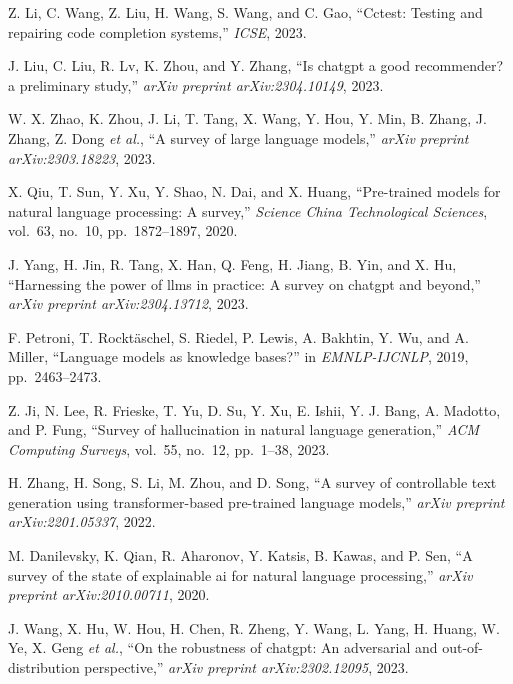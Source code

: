 \begin{enumerate}[leftmargin=2em,label={[\arabic*]}]
\item Z. Li, C. Wang, Z. Liu, H. Wang, S. Wang, and C. Gao, ``Cctest: Testing and repairing code completion systems,'' \textit{ICSE}, 2023.

\item J. Liu, C. Liu, R. Lv, K. Zhou, and Y. Zhang, ``Is chatgpt a good recommender? a preliminary study,'' \textit{arXiv preprint arXiv:2304.10149}, 2023.

\item W. X. Zhao, K. Zhou, J. Li, T. Tang, X. Wang, Y. Hou, Y. Min, B. Zhang, J. Zhang, Z. Dong \textit{et al.}, ``A survey of large language models,'' \textit{arXiv preprint arXiv:2303.18223}, 2023.

\item X. Qiu, T. Sun, Y. Xu, Y. Shao, N. Dai, and X. Huang, ``Pre-trained models for natural language processing: A survey,'' \textit{Science China Technological Sciences}, vol.~63, no.~10, pp.~1872--1897, 2020.

\item J. Yang, H. Jin, R. Tang, X. Han, Q. Feng, H. Jiang, B. Yin, and X. Hu, ``Harnessing the power of llms in practice: A survey on chatgpt and beyond,'' \textit{arXiv preprint arXiv:2304.13712}, 2023.

\item F. Petroni, T. Rockt\"{a}schel, S. Riedel, P. Lewis, A. Bakhtin, Y. Wu, and A. Miller, ``Language models as knowledge bases?'' in \textit{EMNLP-IJCNLP}, 2019, pp.~2463--2473.

\item Z. Ji, N. Lee, R. Frieske, T. Yu, D. Su, Y. Xu, E. Ishii, Y. J. Bang, A. Madotto, and P. Fung, ``Survey of hallucination in natural language generation,'' \textit{ACM Computing Surveys}, vol.~55, no.~12, pp.~1--38, 2023.

\item H. Zhang, H. Song, S. Li, M. Zhou, and D. Song, ``A survey of controllable text generation using transformer-based pre-trained language models,'' \textit{arXiv preprint arXiv:2201.05337}, 2022.

\item M. Danilevsky, K. Qian, R. Aharonov, Y. Katsis, B. Kawas, and P. Sen, ``A survey of the state of explainable ai for natural language processing,'' \textit{arXiv preprint arXiv:2010.00711}, 2020.

\item J. Wang, X. Hu, W. Hou, H. Chen, R. Zheng, Y. Wang, L. Yang, H. Huang, W. Ye, X. Geng \textit{et al.}, ``On the robustness of chatgpt: An adversarial and out-of-distribution perspective,'' \textit{arXiv preprint arXiv:2302.12095}, 2023.


\end{enumerate}
